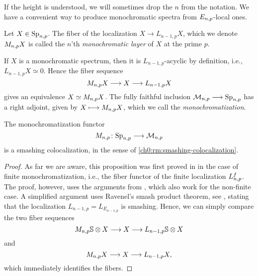 If the height is understood, we will sometimes drop the $n$ from the notation. We have a convenient way to produce monochromatic spectra from $E_{n,p}$-local ones. 

\begin{definition}
    Let $X\in \mathrm{Sp}_{n,p}$. The fiber of the localization $X\longrightarrow L_{n-1,p}X$, which we denote $M_{n,p} X$ is called the $n$'th \emph{monochromatic layer} of $X$ at the prime $p$.
\end{definition}

\begin{remark}
    If $X$ is a monochromatic spectrum, then it is $L_{n-1,p}$-acyclic by definition, i.e., $L_{n-1,p}X\simeq 0$. Hence the fiber sequence 
    \[M_{n,p} X\longrightarrow X\longrightarrow L_{n-1,p}X\]
    gives an equivalence $X\simeq M_{n,p} X$. The fully faithful inclusion $\mathcal{M}_{n,p}\longrightarrow \mathrm{Sp}_{n,p}$ has a right adjoint, given by $X\longmapsto M_{n,p} X$, which we call the \emph{monochromatization}. 
\end{remark}

\begin{proposition}
    \label{ch0:prop:monochromatization-is-smashing}
    The monochromatization functor 
    \[M_{n,p}\colon \mathrm{Sp}_{n,p}\longrightarrow \mathcal{M}_{n,p}\] 
    is a smashing colocalization, in the sense of \cref{ch0:rm:smashing-colocalization}.
\end{proposition}
\begin{proof}
    As far we are aware, this proposition was first proved in \cite[Sec 6.3]{bousfield_1996} in the case of finite monochromatization, i.e., the fiber functor of the finite localization $L_{n,p}^f$. The proof, however, uses the arguments from \cite[2.10]{bousfield_1979_bool}, which also work for the non-finite case. A simplified argument uses Ravenel's smash product theorem, see \cite[7.5.6]{ravenel_92}, stating that the localization $L_{n-1,p} = L_{E_{n-1,p}}$ is smashing. Hence, we can simply compare the two fiber sequences
    \[M_{n,p} \mathbb{S} \otimes X \longrightarrow X \longrightarrow L_{n-1,p}\mathbb{S}\otimes X\] 
    and 
    \[M_{n,p} X\longrightarrow X\longrightarrow L_{n-1,p} X,\]
    which immediately identifies the fibers.  
\end{proof}




